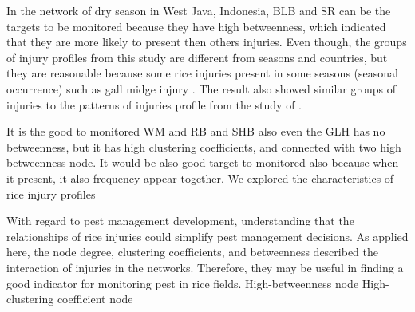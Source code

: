 In the network of dry season in West Java, Indonesia, BLB and SR can be the targets to be monitored because they have high betweenness, which indicated that they are more likely to present then others injuries. Even though, the groups of injury profiles from this study are different from seasons and countries, but they are reasonable because some rice injuries present in some seasons (seasonal occurrence) such as gall midge injury \cite{Krishnaiah_2004_Rice}. The result also showed similar groups of injuries to the patterns of injuries profile from the study of \cite{Savary_2000_Characterization}. 


It is the good to monitored WM and RB and SHB also even the GLH has no betweenness, but it has high clustering coefficients, and connected with two high betweenness node. It would be also good target to monitored also because when it present, it also frequency appear together.
We explored the characteristics of rice injury profiles


With regard to pest management development, understanding that the relationships of rice injuries could simplify pest management decisions. As applied here, the node degree, clustering coefficients, and betweenness described the interaction of injuries in the networks. Therefore, they may be useful in finding a good indicator for monitoring pest in rice fields. High-betweenness node High- clustering coefficient node 

